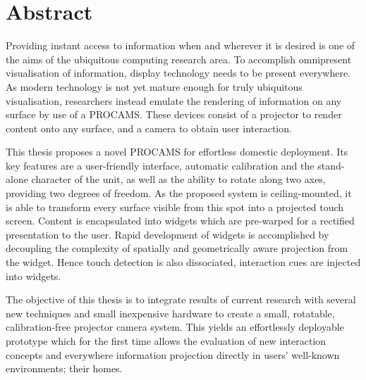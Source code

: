 \chapter*{Abstract}
Providing instant access to information when and wherever it is desired is one of the aims of the ubiquitous computing research area. To accomplish omnipresent visualisation of information, display technology needs to be present everywhere. As modern technology is not yet mature enough for truly ubiquitous visualisation, researchers instead emulate the rendering of information on any surface by use of a \ac{PROCAMS}. These devices consist of a projector to render content onto any surface, and a camera to obtain user interaction.

This thesis proposes a novel PROCAMS for effortless domestic deployment. Its key features are a user-friendly interface, automatic calibration and the stand-alone character of the unit, as well as the ability to rotate along two axes, providing two degrees of freedom. As the proposed system is ceiling-mounted, it is able to transform every surface visible from this spot into a projected touch screen. Content is encapsulated into widgets which are pre-warped for a rectified presentation to the user. Rapid development of widgets is accomplished by decoupling the complexity of spatially and geometrically aware projection from the widget.
Hence touch detection is also dissociated, interaction cues are injected into widgets.

The objective of this thesis is to integrate results of current research with several new techniques and small inexpensive hardware to create a small, rotatable, calibration-free projector camera system. This yields an effortlessly deployable prototype which for the first time allows the evaluation of new interaction concepts and everywhere information projection directly in users' well-known environments; their homes.